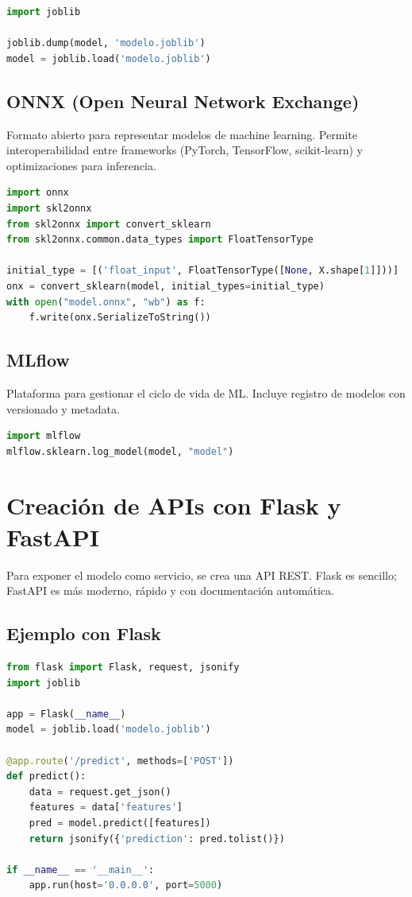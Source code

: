 \documentclass[12pt,a4paper,openany,oneside]{book}
\begin{document}
\begin{lstlisting}[language=Python]
import joblib

joblib.dump(model, 'modelo.joblib')
model = joblib.load('modelo.joblib')
\end{lstlisting}

\subsection{ONNX (Open Neural Network Exchange)}
Formato abierto para representar modelos de machine learning. Permite interoperabilidad entre frameworks (PyTorch, TensorFlow, scikit-learn) y optimizaciones para inferencia.

\begin{lstlisting}[language=Python]
import onnx
import skl2onnx
from skl2onnx import convert_sklearn
from skl2onnx.common.data_types import FloatTensorType

initial_type = [('float_input', FloatTensorType([None, X.shape[1]]))]
onx = convert_sklearn(model, initial_types=initial_type)
with open("model.onnx", "wb") as f:
    f.write(onx.SerializeToString())
\end{lstlisting}

\subsection{MLflow}
Plataforma para gestionar el ciclo de vida de ML. Incluye registro de modelos con versionado y metadata.

\begin{lstlisting}[language=Python]
import mlflow
mlflow.sklearn.log_model(model, "model")
\end{lstlisting}

\section{Creación de APIs con Flask y FastAPI}

Para exponer el modelo como servicio, se crea una API REST. Flask es sencillo; FastAPI es más moderno, rápido y con documentación automática.

\subsection{Ejemplo con Flask}
\begin{lstlisting}[language=Python]
from flask import Flask, request, jsonify
import joblib

app = Flask(__name__)
model = joblib.load('modelo.joblib')

@app.route('/predict', methods=['POST'])
def predict():
    data = request.get_json()
    features = data['features']
    pred = model.predict([features])
    return jsonify({'prediction': pred.tolist()})

if __name__ == '__main__':
    app.run(host='0.0.0.0', port=5000)
\end{lstlisting}
\end{document}
